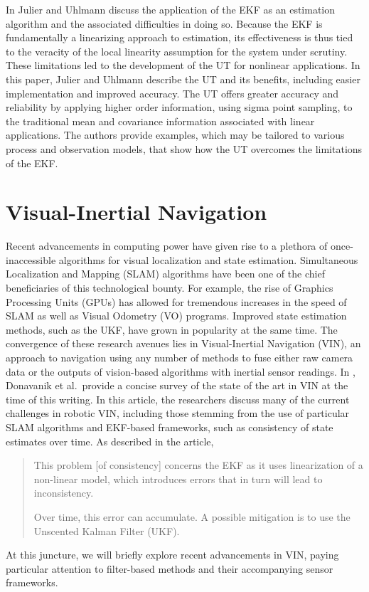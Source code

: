 In \cite{Julier2004} Julier and Uhlmann discuss the application of the EKF as an estimation algorithm and the associated difficulties in doing so. Because the EKF is fundamentally a linearizing approach to estimation, its effectiveness is thus tied to the veracity of the local linearity assumption for the system under scrutiny. These limitations led to the development of the UT for nonlinear applications. In this paper, Julier and Uhlmann describe the UT and its benefits, including easier implementation and improved accuracy. The UT offers greater accuracy and reliability by applying higher order information, using sigma point sampling, to the traditional mean and covariance information associated with linear applications. The authors provide examples, which may be tailored to various process and observation models, that show how the UT overcomes the limitations of the EKF.

\section{Visual-Inertial Navigation}

Recent advancements in computing power have given rise to a plethora of once-inaccessible algorithms for visual localization and state estimation. Simultaneous Localization and Mapping (SLAM) algorithms have been one of the chief beneficiaries of this technological bounty. For example, the rise of Graphics Processing Units (GPUs) has allowed for tremendous increases in the speed of SLAM as well as Visual Odometry (VO) programs. Improved state estimation methods, such as the UKF, have grown in popularity at the same time. The convergence of these research avenues lies in Visual-Inertial Navigation (VIN), an approach to navigation using any number of methods to fuse either raw camera data or the outputs of vision-based algorithms with inertial sensor readings. In \cite{Donavanik2016}, Donavanik et al.\ provide a concise survey of the state of the art in VIN at the time of this writing. In this article, the researchers discuss many of the current challenges in robotic VIN, including those stemming from the use of particular SLAM algorithms and EKF-based frameworks, such as consistency of state estimates over time. As described in the article,
%
\begin{quote}
This problem [of consistency] concerns the EKF as it uses linearization of a non-linear model, which introduces errors that in turn will lead to inconsistency.

Over time, this error can accumulate. A possible mitigation is to use the Unscented Kalman Filter (UKF). 
\end{quote}
%
At this juncture, we will briefly explore recent advancements in VIN, paying particular attention to filter-based methods and their accompanying sensor frameworks.

